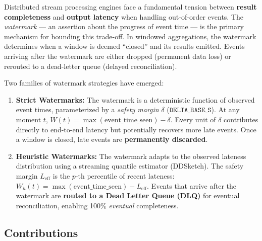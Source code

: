 \documentclass[11pt,a4paper]{article}
\newcommand{\Leff}{L_{\text{eff}}}
\begin{document}
Distributed stream processing engines face a fundamental tension between \textbf{result completeness} and \textbf{output latency} when handling out-of-order events.
The \textit{watermark} --- an assertion about the progress of event time --- is the primary mechanism for bounding this trade-off.
In windowed aggregations, the watermark determines when a window is deemed ``closed'' and its results emitted.
Events arriving after the watermark are either dropped (permanent data loss) or rerouted to a dead-letter queue (delayed reconciliation).

Two families of watermark strategies have emerged:

\begin{enumerate}[leftmargin=*, itemsep=3pt]
\item \textbf{Strict Watermarks:}
  The watermark is a deterministic function of observed event times, parameterized by a \textit{safety margin} $\delta$ ($\texttt{DELTA\_BASE\_S}$).
  At any moment $t$, $W(t) = \max(\text{event\_time\_seen}) - \delta$.
  Every unit of $\delta$ contributes directly to end-to-end latency but potentially recovers more late events.
  Once a window is closed, late events are \textbf{permanently discarded}.

\item \textbf{Heuristic Watermarks:}
  The watermark adapts to the observed lateness distribution using a streaming quantile estimator (DDSketch).
  The safety margin $\Leff$ is the $p$-th percentile of recent lateness:
  $W_h(t) = \max(\text{event\_time\_seen}) - \Leff$.
  Events that arrive after the watermark are \textbf{routed to a Dead Letter Queue (DLQ)} for eventual reconciliation, enabling 100\% \textit{eventual} completeness.
\end{enumerate}

\subsection{Contributions}
\end{document}
